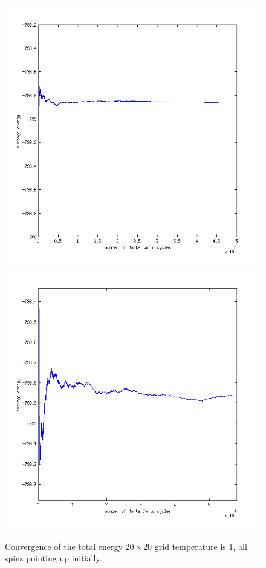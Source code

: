\documentclass[a4paper,english, 10pt, twoside]{article}
\begin{document}
\begin{figure}[H]
\includegraphics[scale=0.45]{energy_ordered_temp1.png}
\includegraphics[scale=0.45]{energy_ordered_temp1_zoom.png}
\caption{Convergence of the total energy $20 \times 20$ grid temperature is 1, all spins pointing up initially.}
\label{energy_ordered_temp1}
\end{figure}
\end{document}
